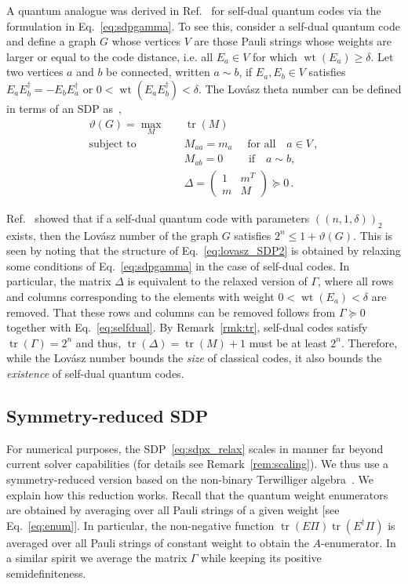 \documentclass[12pt,a4paper]{amsart}
\DeclareMathOperator{\tr}{tr}
\DeclareMathOperator{\wt}{wt}
\newcommand{\nn}{\nonumber}
\begin{document}
A quantum analogue was derived in Ref.~\cite{munne2025sdpboundsquantumcodes} for self-dual quantum codes via the formulation in Eq.~\eqref{eq:sdpgamma}.
% 
To see this, consider a self-dual quantum code
and 
define a graph $G$ whose vertices $V$ are those Pauli strings whose weights are larger or equal to the code distance, i.e. all $E_a\in V$ for which $\wt(E_a)\geq \delta$.
% 
Let two vertices $a$ and $b$ be connected, written $a \sim b$, if $E_a,E_b \in V$ satisfies
$E_a E^\dag_b = -E_b E^\dag_a$ or $0<\wt(E_a E^\dag_b)<\delta$.
% 
The Lovász theta number can be defined in terms of an SDP as~\cite{1055985,GALLI2017159},
% 
\begin{align}\label{eq:lovasz_SDP2}
    \vartheta(G)=\max_M \quad & \tr(M) \nn \\
    \text{subject to} \quad & M_{aa}=m_a \quad\,\, \text{for all}\quad a \in V \,,  \nn\\
    & M_{ab}=0  \quad \,\,\quad\text{if}\quad a\sim b ,\nn \\
    & \Delta = \begin{pmatrix} 1 & m^T\\ m & M \end{pmatrix} \succeq 0 \,.
\end{align}

Ref.~\cite{munne2025sdpboundsquantumcodes} showed that if a self-dual quantum code with parameters $(\!(n,1,\delta)\!)_2$ exists, then the Lovász number of the graph $G$ satisfies $2^n \leq 1+\vartheta(G)$.
% 
This is seen by noting that the structure of Eq.~\eqref{eq:lovasz_SDP2} is obtained by relaxing some conditions of Eq.~\eqref{eq:sdpgamma} in the case of self-dual codes. 
% 
In particular, the matrix $\Delta$ is equivalent to the relaxed version of $\Gamma$, where all rows and columns corresponding to the elements with weight $0 < \wt(E_a) < \delta$ are removed.
% 
That these rows and columns can be removed follows from $\Gamma \succeq 0$ together with Eq.~\eqref{eq:selfdual}. 
% 
By Remark~\ref{rmk:tr}, self-dual codes satisfy $\tr(\Gamma)=2^n$ and thus, $\tr(\Delta)=\tr(M)+1$ must be at least $2^n$. 
% 
Therefore, 
while the Lovász number bounds the {\em size} of classical codes, 
it also bounds the {\em existence} of self-dual quantum codes.

\subsection{Symmetry-reduced SDP}
%
For numerical purposes, the SDP~\eqref{eq:sdpx_relax} scales in manner 
far beyond current solver capabilities
(for details see Remark~\ref{rem:scaling}).
We thus use a symmetry-reduced version based on the non-binary Terwilliger algebra~\cite{GIJSWIJT20061719}.
%
We explain how this reduction works.
% 
Recall that the quantum weight enumerators are obtained by averaging over all Pauli strings of a given weight [see Eq.~\eqref{eq:enum}].
% 
In particular, 
the non-negative function $\tr(E\Pi)\tr(E^\dagger \Pi)$ is averaged over all Pauli strings of constant weight to obtain the 
$A$-enumerator.
In a similar spirit we average the matrix $\Gamma$ 
while keeping its positive semidefiniteness.
\end{document}
